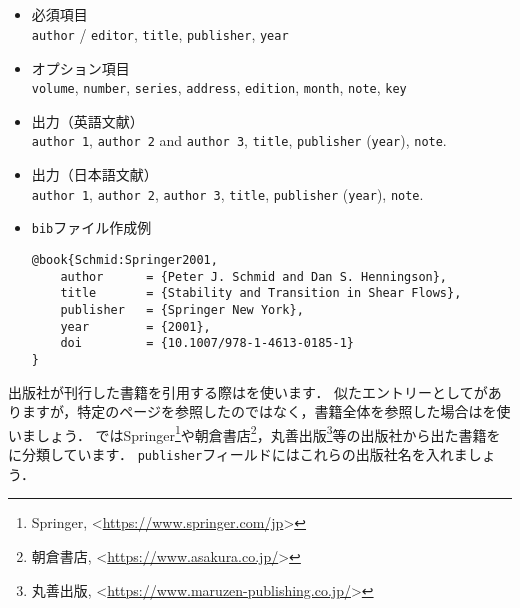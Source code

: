 \documentclass[a4paper,fleqn,uplatex,dvipdfmx]{jsarticle}
\begin{document}
\subsection{\ttbook}
\label{ssec:book}
\begin{screen}
    \begin{itemize}
        \item 必須項目 \\
        \verb|author| / \verb|editor|, \verb|title|, \verb|publisher|, \verb|year|
        \item オプション項目 \\
        \verb|volume|, \verb|number|, \verb|series|, \verb|address|, \verb|edition|, \verb|month|, \verb|note|, \verb|key|
        \item 出力（英語文献） \\
            \colorbox[gray]{0.8}{\texttt{author 1}}, \colorbox[gray]{0.8}{\texttt{author 2}} and \colorbox[gray]{0.8}{\texttt{author 3}}, \colorbox[gray]{0.8}{\texttt{title}}, \colorbox[gray]{0.8}{\texttt{publisher}} (\colorbox[gray]{0.8}{\texttt{year}}), \colorbox[gray]{0.8}{\texttt{note}}.
        \item 出力（日本語文献） \\
            \colorbox[gray]{0.8}{\texttt{author 1}}, \colorbox[gray]{0.8}{\texttt{author 2}}, \colorbox[gray]{0.8}{\texttt{author 3}}, \colorbox[gray]{0.8}{\texttt{title}}, \colorbox[gray]{0.8}{\texttt{publisher}} (\colorbox[gray]{0.8}{\texttt{year}}), \colorbox[gray]{0.8}{\texttt{note}}.
        \item \verb|bib|ファイル作成例 \vspace{-3mm}
\begin{verbatim}
@book{Schmid:Springer2001,
    author      = {Peter J. Schmid and Dan S. Henningson},
    title       = {Stability and Transition in Shear Flows},
    publisher   = {Springer New York},
    year        = {2001},
    doi         = {10.1007/978-1-4613-0185-1}
}
\end{verbatim}
    \end{itemize}
\end{screen}

出版社が刊行した書籍を引用する際は\ttbook を使います．
似たエントリーとして\ttinbook がありますが，特定のページを参照したのではなく，書籍全体を参照した場合は\ttbook を使いましょう．
\JSMErepos ではSpringer\footnote{Springer, \textless\url{https://www.springer.com/jp}\textgreater}や朝倉書店\footnote{朝倉書店, \textless\url{https://www.asakura.co.jp/}\textgreater}，丸善出版\footnote{丸善出版, \textless\url{https://www.maruzen-publishing.co.jp/}\textgreater}等の出版社から出た書籍を\ttbook に分類しています．
\verb|publisher|フィールドにはこれらの出版社名を入れましょう．
\end{document}
